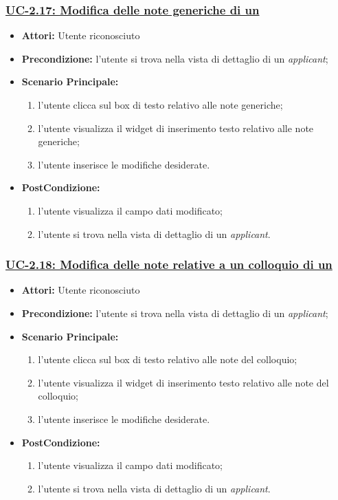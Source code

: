 \subsubsection{\underline{UC-2.17: Modifica delle note generiche di un \applicant}}
\begin{itemize}
	\item \textbf{Attori:} Utente riconosciuto
	\item \textbf{Precondizione:}  l'utente si trova nella vista di dettaglio di un \textit{applicant};
	\item \textbf{Scenario Principale:}
	\begin{enumerate}
		\item l'utente clicca sul box di testo relativo alle note generiche;
		\item l'utente visualizza il  widget di inserimento testo relativo alle note generiche;
		\item l'utente inserisce le modifiche desiderate.
	\end{enumerate}
	\item \textbf{PostCondizione:} 
	\begin{enumerate}
		\item l'utente visualizza il campo dati modificato;
		\item l'utente si trova nella vista di dettaglio di un \textit{applicant}.
	\end{enumerate}
	
\end{itemize}

\subsubsection{\underline{UC-2.18: Modifica delle note relative a un colloquio di un \applicant}}
\begin{itemize}
	\item \textbf{Attori:} Utente riconosciuto
	\item \textbf{Precondizione:}  l'utente si trova nella vista di dettaglio di un \textit{applicant};
	\item \textbf{Scenario Principale:}
	\begin{enumerate}
		\item l'utente clicca sul box di testo relativo alle note del colloquio;
		\item l'utente visualizza il  widget di inserimento testo relativo alle note del colloquio;
		\item l'utente inserisce le modifiche desiderate.
	\end{enumerate}
	\item \textbf{PostCondizione:} 
	\begin{enumerate}
		\item l'utente visualizza il campo dati modificato;
		\item l'utente si trova nella vista di dettaglio di un \textit{applicant}.
	\end{enumerate}
	
\end{itemize}

